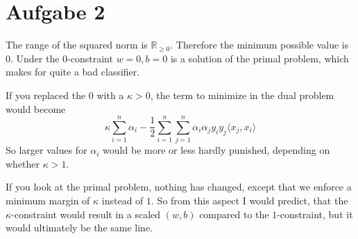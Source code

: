 \documentclass[10pt,a4paper]{article}
\begin{document}
\section{Aufgabe 2}

The range of the squared norm is $\mathbb{R}_{\ge 0}$. Therefore the minimum
possible value is $0$. Under the $0$-constraint $w = 0, b = 0$ is a solution of
the primal problem, which makes for quite a bad classifier.

If you replaced the $0$ with a $\kappa > 0$, the term to minimize in the dual
problem would become
\begin{equation}
  \kappa \sum_{i = 1}^{n} \alpha_{i} - \frac{1}{2} \sum_{i = 1}^{n} \sum_{j = 1}^{n} \alpha_{i}\alpha_{j}y_{i}y_{j}\langle x_{j}, x_{i} \rangle
\end{equation}
So larger values for $\alpha_{i}$ would be more or less hardly punished,
depending on whether $\kappa > 1$.

If you look at the primal problem, nothing has changed, except that we enforce a
minimum margin of $\kappa$ instead of $1$. So from this aspect I would predict,
that the $\kappa$-constraint would result in a scaled $(w, b)$ compared to the
$1$-constraint, but it would ultimately be the same line.
\end{document}
